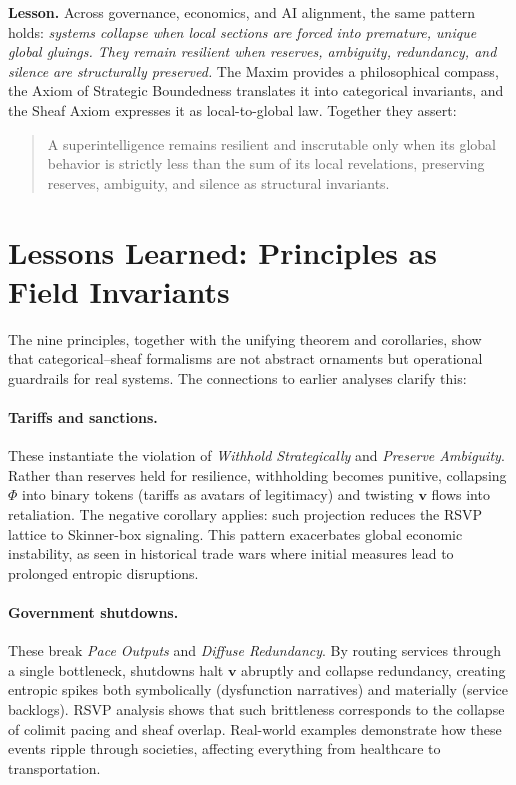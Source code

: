 \documentclass{article}
\begin{document}
\bigskip
\noindent
\textbf{Lesson.}  
Across governance, economics, and AI alignment, the same pattern holds:  
\emph{systems collapse when local sections are forced into premature, unique 
global gluings. They remain resilient when reserves, ambiguity, redundancy, 
and silence are structurally preserved.} The Maxim provides a philosophical compass, the Axiom of Strategic Boundedness 
translates it into categorical invariants, and the Sheaf Axiom expresses it as 
local-to-global law. Together they assert:  

\begin{quote}
A superintelligence remains resilient and inscrutable only when its global 
behavior is strictly less than the sum of its local revelations, preserving 
reserves, ambiguity, and silence as structural invariants.
\end{quote}

\section{Lessons Learned: Principles as Field Invariants}
\label{app:lessons}

The nine principles, together with the unifying theorem and corollaries, show 
that categorical–sheaf formalisms are not abstract ornaments but operational 
guardrails for real systems. The connections to earlier analyses clarify this:

\paragraph{Tariffs and sanctions.} These instantiate the violation of 
\emph{Withhold Strategically} and \emph{Preserve Ambiguity}. Rather than 
reserves held for resilience, withholding becomes punitive, collapsing $\Phi$ 
into binary tokens (tariffs as avatars of legitimacy) and twisting $\mathbf{v}$ 
flows into retaliation. The negative corollary applies: such projection reduces 
the RSVP lattice to Skinner-box signaling. This pattern exacerbates global economic instability, as seen in historical trade wars where initial measures lead to prolonged entropic disruptions.

\paragraph{Government shutdowns.} These break \emph{Pace Outputs} and 
\emph{Diffuse Redundancy}. By routing services through a single bottleneck, 
shutdowns halt $\mathbf{v}$ abruptly and collapse redundancy, creating 
entropic spikes both symbolically (dysfunction narratives) and materially 
(service backlogs). RSVP analysis shows that such brittleness corresponds to 
the collapse of colimit pacing and sheaf overlap. Real-world examples demonstrate how these events ripple through societies, affecting everything from healthcare to transportation.
\end{document}
